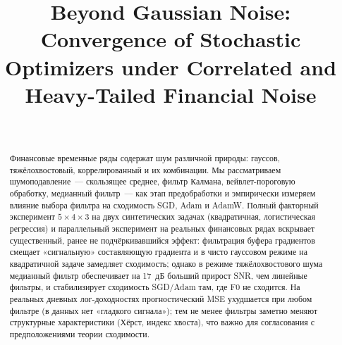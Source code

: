 \documentclass[conference]{IEEEtran}
\begin{document}
\title{Beyond Gaussian Noise: Convergence of Stochastic Optimizers under Correlated and Heavy-Tailed Financial Noise}

\author{%
\\
\and
{}
\and
{}
\and
{}
}

\maketitle

\begin{abstract}
Финансовые временные ряды содержат шум различной природы: гауссов,
тяжёлохвостовый, коррелированный и их комбинации. Мы рассматриваем
шумоподавление~--- скользящее среднее, фильтр Калмана, вейвлет-пороговую
обработку, медианный фильтр~--- как этап предобработки и эмпирически
измеряем влияние выбора фильтра на сходимость SGD, Adam и AdamW. Полный
факторный эксперимент $5\times4\times3$ на двух синтетических задачах
(квадратичная, логистическая регрессия) и параллельный эксперимент на
реальных финансовых рядах вскрывает существенный, ранее не
подчёркивавшийся эффект: фильтрация буфера градиентов смещает «сигнальную»
составляющую градиента и в чисто гауссовом режиме на квадратичной задаче
замедляет сходимость; однако в режиме тяжёлохвостового шума медианный
фильтр обеспечивает на 17~дБ больший прирост SNR, чем линейные фильтры, и
стабилизирует сходимость SGD/Adam там, где F0 не сходится. На реальных
дневных лог-доходностях прогностический MSE ухудшается при любом фильтре
(в данных нет «гладкого сигнала»); тем не менее фильтры заметно меняют
структурные характеристики (Хёрст, индекс хвоста), что важно для
согласования с предположениями теории сходимости.

\end{abstract}
\end{document}
